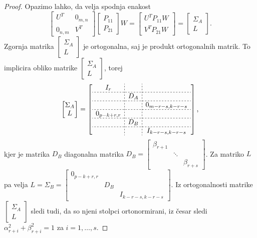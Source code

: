 \documentclass[mat1]{article}
\begin{document}
\begin{proof}
Opazimo lahko, da velja spodnja enakost
$$
\begin{bmatrix} 
U^T & 0_{m, n} \\
0_{n, m} & V^T
\end{bmatrix}
\begin{bmatrix}
P_{11} \\
P_{21}
\end{bmatrix} W = 
\begin{bmatrix}
U^T P_{11} W \\
V^TP_{21} W
\end{bmatrix} =
\begin{bmatrix}
\Sigma_A \\
L
\end{bmatrix}.
$$
Zgornja matrika $\begin{bmatrix}
\Sigma_A \\
L
\end{bmatrix}$ je ortogonalna, saj je produkt ortogonalnih matrik. To implicira obliko matrike $ \begin{bmatrix}
\Sigma_A \\
L
\end{bmatrix}$, torej
$$
\begin{bmatrix}
\Sigma_A \\
L
\end{bmatrix} =
\left[
\begin{array}{c;{2pt/2pt}c;{2pt/2pt}c}
I_r & & \\ 
\hdashline[2pt/2pt]
 & D_A & \\ 
\hdashline[2pt/2pt]
 & & 0_{m-r-s, k-r-s} \\ 
\hdashline[2pt/2pt]
0_{p-k+r, r} & & \\ 
\hdashline[2pt/2pt]
 & D_B & \\ 
\hdashline[2pt/2pt]
 & & I_{k-r-s, k-r-s}
\end{array} \right] 
\text{,}
$$ kjer je matrika $D_B$ diagonalna matrika 
$  D_B = 
\begin{bmatrix}
\beta_{r+1} & & \\
 & \ddots & \\
 & & \beta_{r+s}
\end{bmatrix}$.
Za matriko $L$ pa velja $L = \Sigma_B =
\begin{bmatrix}
0_{p-k+r, r} & & \\ 
 & D_B & \\ 
 & & I_{k-r-s, k-r-s}
\end{bmatrix}$.
Iz ortogonalnosti matrike $\begin{bmatrix}
\Sigma_A \\
L
\end{bmatrix}$ sledi tudi, da so njeni stolpci ortonormirani, iz česar sledi $\alpha_{r+i}^2 + \beta_{r+i}^2 = 1$ za $i = 1, \ldots, s$.


\end{proof}
\end{document}
